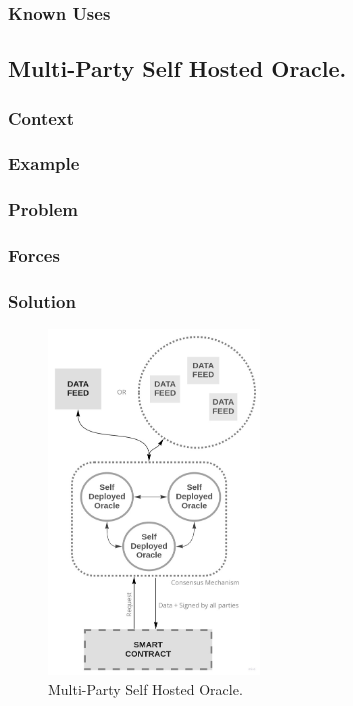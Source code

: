 \subsubsection{Known Uses}

\subsection{Multi-Party Self Hosted Oracle.}

\subsubsection{Context}
\subsubsection{Example}
\subsubsection{Problem}
\subsubsection{Forces}
\subsubsection{Solution}

\begin{figure}[t]
  \begin{center}
    \leavevmode
    \includegraphics[width=0.5\textwidth]{figures/oraclearch4.jpg}
    \caption{Multi-Party Self Hosted Oracle.}
    \label{fig:/figures/paper-screening}
  \end{center}
\end{figure}

